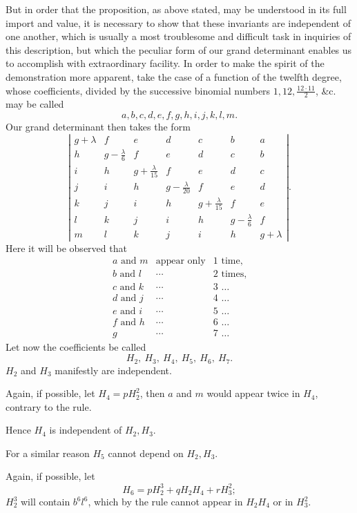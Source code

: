 \documentclass[11pt]{article}
\newcommand{\sourcepage}[1]{\marginpar{\scriptsize p.~#1}}
\begin{document}
{{But in order that the proposition, as above stated, may be understood in its full import and value, it is necessary to show that these invariants are independent of one another, which is usually a most troublesome and difficult task in inquiries of this description, but which the peculiar form of our grand determinant enables us to accomplish with extraordinary facility. In order to make the spirit of the demonstration more apparent, take the case of a function of the twelfth degree, whose coefficients, divided by the successive binomial numbers $1,12,\frac{12\cdot11}{2}$, \&c. may be called
\[
a,b,c,d,e,f,g,h,i,j,k,l,m.
\]
\sourcepage{278}
Our grand determinant then takes the form
\[
\left|\begin{array}{ccccccc}
g+\lambda&f&e&d&c&b&a\\
h&g-\frac{\lambda}{6}&f&e&d&c&b\\
i&h&g+\frac{\lambda}{15}&f&e&d&c\\
j&i&h&g-\frac{\lambda}{20}&f&e&d\\
k&j&i&h&g+\frac{\lambda}{15}&f&e\\
l&k&j&i&h&g-\frac{\lambda}{6}&f\\
m&l&k&j&i&h&g+\lambda
\end{array}\right|.
\]
Here it will be observed that
\[
\begin{array}{rcl}
a\text{ and }m&\text{appear only}&1\text{ time,}\\
b\text{ and }l&\cdots&2\text{ times,}\\
c\text{ and }k&\cdots&3\text{ \ldots}\\
d\text{ and }j&\cdots&4\text{ \ldots}\\
e\text{ and }i&\cdots&5\text{ \ldots}\\
f\text{ and }h&\cdots&6\text{ \ldots}\\
g&\cdots&7\text{ \ldots}
\end{array}
\]
Let now the coefficients be called
\[
H_2,\ H_3,\ H_4,\ H_5,\ H_6,\ H_7.
\]
$H_2$ and $H_3$ manifestly are independent.

Again, if possible, let $H_4=pH_2^2$, then $a$ and $m$ would appear twice in $H_4$, contrary to the rule.

Hence $H_4$ is independent of $H_2,H_3$.

For a similar reason $H_5$ cannot depend on $H_2,H_3$.

Again, if possible, let
\[
H_6=pH_2^3+qH_2H_4+rH_3^2;
\]
$H_2^3$ will contain $b^6l^6$, which by the rule cannot appear in $H_2H_4$ or in $H_3^2$.

}}
\end{document}
